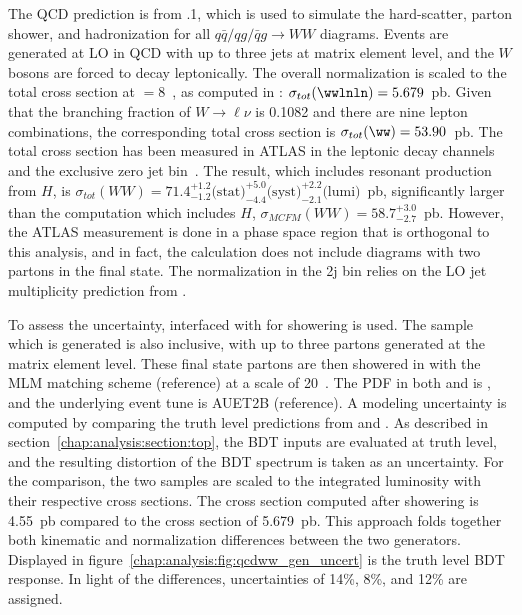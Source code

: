 The QCD \ww prediction is from .1, which is used to simulate the
hard-scatter, parton shower, and hadronization for all
$q\bar{q}/qg/\bar{q}g\rightarrow{WW}$ diagrams. Events are generated
at LO in QCD with up to three jets at matrix element level, and the $W$ bosons are
forced to decay leptonically. The overall normalization is
scaled to the total \ww cross section at \sqrts$=8$~\tev, as computed
in \MCFM: $\sigma_{tot}(\wwlnln) = 5.679$~pb. Given that the branching
fraction of $W\rightarrow{\ell\nu}$ is 0.1082 and there are nine
lepton combinations, the corresponding total cross section is
$\sigma_{tot}(\ww) = 53.90$~pb. The total \ww cross section has been
measured in ATLAS in the \ww leptonic decay channels and the exclusive zero jet
bin~\cite{bib:ww_cross_section}. The result, which includes resonant \ww production from $H$, is
$\sigma_{tot}(WW) = 71.4^{+1.2}_{-1.2} \textrm{(stat)} ^{+5.0}_{-4.4}
\textrm{(syst)}^{+2.2}_{-2.1}\textrm{(lumi)}$~pb, significantly larger
than the \MCFM computation which includes $H$, $\sigma_{MCFM}(WW) =
58.7^{+3.0}_{-2.7}$~pb. However, the ATLAS measurement is done in a phase space
region that is orthogonal to this analysis, and in fact, the \MCFM
calculation does not include diagrams with two partons in the final
state. The normalization in the 2j bin relies on the LO jet multiplicity prediction
from \SHERPA. 

To assess the uncertainty, \MADGRAPH interfaced
with  for showering is used. The sample which is generated is
also inclusive, with up to three partons generated at the matrix element
level. These final state partons are then showered in \PYTHIA with the
MLM matching scheme (reference) at a scale of 20~\gev. The PDF in
both \MADGRAPH and \PYTHIA is \cteqsixl, and the underlying event tune
is AUET2B (reference). A modeling uncertainty is computed by comparing
the truth level predictions from \SHERPA and \MADGRAPH. As described
in section~\ref{chap:analysis:section:top}, the BDT inputs are
evaluated at truth level, and the resulting distortion of the BDT
spectrum is taken as an uncertainty. For the comparison, the two
samples are scaled to the integrated luminosity with their respective
cross sections. The \MADGRAPH cross section computed after showering is
4.55~pb compared to the \SHERPA cross section of 5.679~pb. This
approach folds together both kinematic and normalization differences
between the two generators. Displayed in
figure~\ref{chap:analysis:fig:qcdww_gen_uncert} is the truth level BDT
response. In light of the differences, uncertainties of 14\%, 8\%, and
12\% are assigned. 

